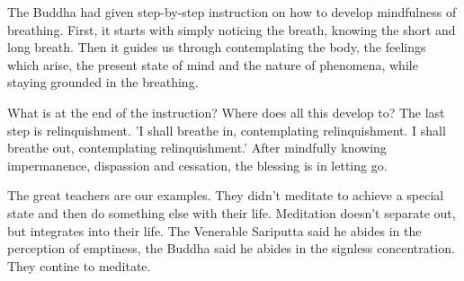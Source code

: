 The Buddha had given step-by-step instruction on how to develop
mindfulness of breathing. First, it starts with simply noticing the
breath, knowing the short and long breath. Then it guides us through
contemplating the body, the feelings which arise, the present state of
mind and the nature of phenomena, while staying grounded in the
breathing.

What is at the end of the instruction? Where does all this develop to?
The last step is relinquishment. 'I shall breathe in, contemplating
relinquishment. I shall breathe out, contemplating relinquishment.'
After mindfully knowing impermanence, dispassion and cessation, the
blessing is in letting go.

The great teachers are our examples. They didn't meditate to achieve a
special state and then do something else with their life. Meditation
doesn't separate out, but integrates into their life. The Venerable
Sariputta said he abides in the perception of emptiness, the Buddha said
he abides in the signless concentration. They contine to meditate.
